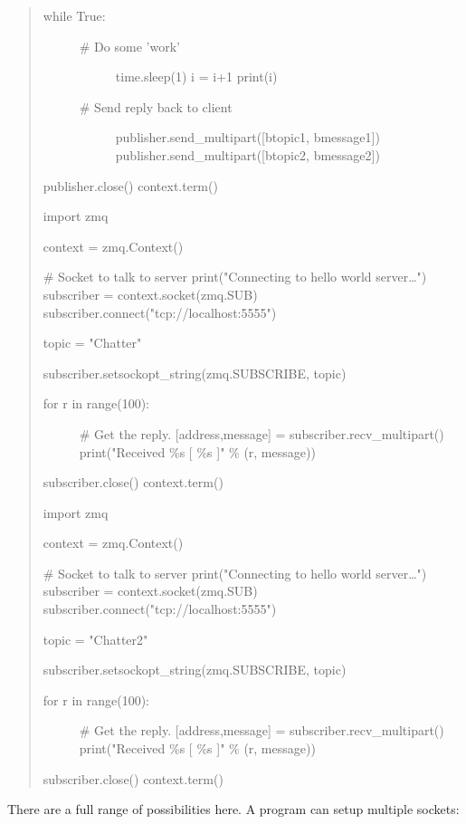 \begin{quote}
\begin{description}
\item[while True:]
\begin{description}
\item[\# Do some 'work']
time.sleep(1) i = i+1 print(i)
\item[\# Send reply back to client]
publisher.send\_multipart({[}btopic1, bmessage1{]})
publisher.send\_multipart({[}btopic2, bmessage2{]})
\end{description}
\end{description}

publisher.close() context.term()

import zmq

context = zmq.Context()

\# Socket to talk to server print("Connecting to hello world
server\ldots") subscriber = context.socket(zmq.SUB)
subscriber.connect("tcp://localhost:5555")

topic = "Chatter"

subscriber.setsockopt\_string(zmq.SUBSCRIBE, topic)

\begin{description}
\item[for r in range(100):]
\# Get the reply. {[}address,message{]} = subscriber.recv\_multipart()
print("Received \%s {[} \%s {]}" \% (r, message))
\end{description}

subscriber.close() context.term()

import zmq

context = zmq.Context()

\# Socket to talk to server print("Connecting to hello world
server\ldots") subscriber = context.socket(zmq.SUB)
subscriber.connect("tcp://localhost:5555")

topic = "Chatter2"

subscriber.setsockopt\_string(zmq.SUBSCRIBE, topic)

\begin{description}
\item[for r in range(100):]
\# Get the reply. {[}address,message{]} = subscriber.recv\_multipart()
print("Received \%s {[} \%s {]}" \% (r, message))
\end{description}

subscriber.close() context.term()
\end{quote}

There are a full range of possibilities here. A program can setup
multiple sockets:

